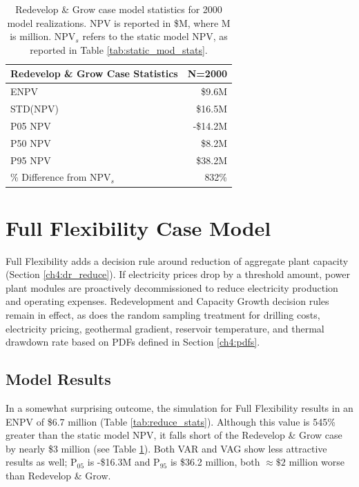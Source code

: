 \begin{table}[H]
\centering
\begin{tabular}{|l|r|}
\hline
\textbf{Redevelop \& Grow Case Statistics} & N=2000 \\ \hline
ENPV & \$9.6M \\ \hline
STD(NPV) & \$16.5M \\ \hline
P05 NPV & -\$14.2M \\ \hline
P50 NPV & \$8.2M \\ \hline
P95 NPV & \$38.2M \\ \hline
\% Difference from NPV$_{s}$ & 832\% \\ \hline
\end{tabular}
\caption[Redevelop \& Grow Case statistics]{Redevelop \& Grow case model statistics for 2000 model realizations. NPV is reported in \$M, where M is million. NPV$_s$ refers to the static model NPV, as reported in Table \ref{tab:static_mod_stats}.}
\label{tab:grow_stats}
\end{table}

\section{Full Flexibility Case Model}\label{ch6:reduce_case}
Full Flexibility adds a decision rule around reduction of aggregate plant capacity (Section \ref{ch4:dr_reduce}). If electricity prices drop by a threshold amount, power plant modules are proactively decommissioned to reduce electricity production and operating expenses. Redevelopment and Capacity Growth decision rules remain in effect, as does the random sampling treatment for drilling costs, electricity pricing, geothermal gradient, reservoir temperature, and thermal drawdown rate based on PDFs defined in Section \ref{ch4:pdfs}.

\subsection{Model Results}\label{ch6:reduce_results}
In a somewhat surprising outcome, the simulation for Full Flexibility results in an ENPV of \$6.7 million (Table \ref{tab:reduce_stats}). Although this value is 545\% greater than the static model NPV, it falls short of the Redevelop \& Grow case by nearly \$3 million (see Table \ref{tab:grow_stats}). Both VAR and VAG show less attractive results as well; P$_{05}$ is -\$16.3M and P$_{95}$ is \$36.2 million, both $\approx\$2$ million worse than Redevelop \& Grow.  

